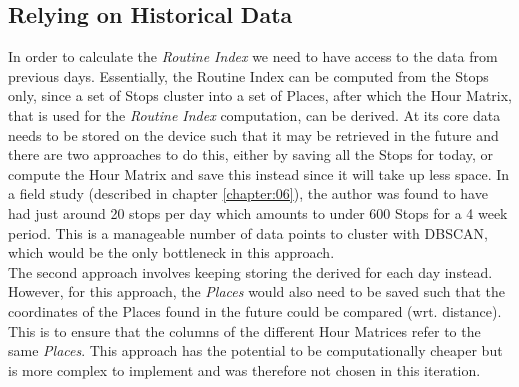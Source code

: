 \subsection{Relying on Historical Data}
In order to calculate the \textit{Routine Index} we need to have access to the data from previous days. Essentially, the Routine Index can be computed from the Stops only, since a set of Stops cluster into a set of Places, after which the Hour Matrix, that is used for the \textit{Routine Index} computation, can be derived. At its core data needs to be stored on the device such that it may be retrieved in the future and there are two approaches to do this, either by saving all the Stops for today, or compute the Hour Matrix and save this instead since it will take up less space. In a field study (described in chapter \ref{chapter:06}), the author was found to have had just around 20 stops per day which amounts to under 600 Stops for a 4 week period. This is a manageable number of data points to cluster with DBSCAN, which would be the only bottleneck in this approach.\\

The second approach involves keeping storing the derived  for each day instead. However, for this approach, the \textit{Places} would also need to be saved such that the coordinates of the Places found in the future could be compared (wrt. distance). This is to ensure that the columns of the different Hour Matrices refer to the same \textit{Places}. This approach has the potential to be computationally cheaper but is more complex to implement and was therefore not chosen in this iteration.